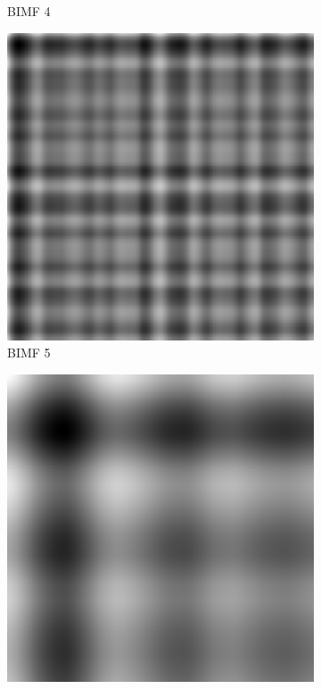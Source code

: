 \begin{figure}
\begin{subfigure}{.30\textwidth}
  \caption{BIMF 4}
\end{subfigure}
\begin{subfigure}{.30\textwidth}
  \centering
  \includegraphics[width=.9\linewidth]{img/s_5_1_5}
  \caption{BIMF 5}
\end{subfigure}
\begin{subfigure}{.30\textwidth}
  \centering
  \includegraphics[width=.9\linewidth]{img/s_5_1_6}

\end{subfigure}
\end{figure}
